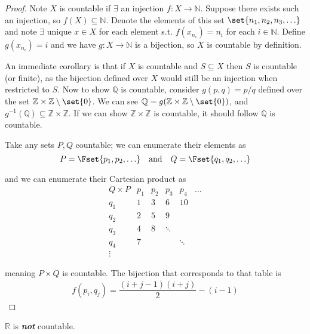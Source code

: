 \documentclass{article}
\begin{document}
\begin{proof}
  Note $X$ is countable if $\exists$ an injection $f: X \to \mathbb{N}$. Suppose there exists such an injection, so $f(X) \subseteq \mathbb{N}$. Denote the elements of this set $\set{n_1, n_2, n_3, \ldots}$ and note $\exists$ unique $x \in X$ for each element s.t. $f(x_{n_i}) = n_i$ for each $i \in \mathbb{N}$. Define $g(x_{n_i}) = i$ and we have $g: X \to \mathbb{N}$ is a bijection, so $X$ is countable by definition.

  An immediate corollary is that if $X$ is countable and $S \subseteq X$ then $S$ is countable (or finite), as the bijection defined over $X$ would still be an injection when restricted to $S$. Now to show $\mathbb{Q}$ is countable, consider $g(p, q) = p / q$ defined over the set $\mathbb{Z} \times \mathbb{Z}\setminus\set{0}$. We can see $\mathbb{Q} = g(\mathbb{Z} \times \mathbb{Z}\setminus\set{0})$, and $g^{-1}(\mathbb{Q}) \subseteq \mathbb{Z} \times \mathbb{Z}$. If we can show $\mathbb{Z} \times \mathbb{Z}$ is countable, it should follow $\mathbb{Q}$ is countable.

  Take any sets $P, Q$ countable; we can enumerate their elements as
  \[
    P = \Fset{p_1, p_2, \ldots}
    \quad
    \text{and}
    \quad
    Q = \Fset{q_1, q_2, \ldots}
  \]

  and we can enumerate their Cartesian product as
  \[
    \begin{matrix}
      Q \times P & p_1 & p_2 & p_3    & p_4    & \ldots \\
      q_1        & 1   & 3   & 6      & 10     &        \\
      q_2        & 2   & 5   & 9      &        &        \\
      q_3        & 4   & 8   & \ddots &        &        \\
      q_4        & 7   &     &        & \ddots &        \\
      \vdots
    \end{matrix}
  \]

  meaning $P \times Q$ is countable. The bijection that corresponds to that table is
  \begin{align*}
    f(p_i, q_j) = \dfrac{(i + j - 1)(i + j)}{2} - (i - 1)
  \end{align*}
\end{proof}

\begin{claim}
  $\mathbb{R}$ is \textbf{\textit{not}} countable.
\end{claim}
\end{document}
